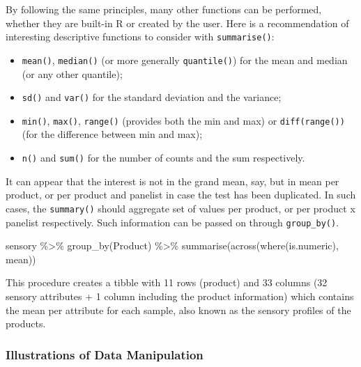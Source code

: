 \documentclass[
]{book}
\newenvironment{Shaded}{\begin{snugshade}}{\end{snugshade}}
\newcommand{\FunctionTok}[1]{\textcolor[rgb]{0.00,0.00,0.00}{#1}}
\newcommand{\NormalTok}[1]{#1}
\newcommand{\SpecialCharTok}[1]{\textcolor[rgb]{0.00,0.00,0.00}{#1}}
\providecommand{\tightlist}{%
  \setlength{\itemsep}{0pt}\setlength{\parskip}{0pt}}
\begin{document}
By following the same principles, many other functions can be performed, whether they are built-in R or created by the user.
Here is a recommendation of interesting descriptive functions to consider with \texttt{summarise()}:

\begin{itemize}
\tightlist
\item
  \texttt{mean()}, \texttt{median()} (or more generally \texttt{quantile()}) for the mean and median (or any other quantile);
\item
  \texttt{sd()} and \texttt{var()} for the standard deviation and the variance;
\item
  \texttt{min()}, \texttt{max()}, \texttt{range()} (provides both the min and max) or \texttt{diff(range())} (for the difference between min and max);
\item
  \texttt{n()} and \texttt{sum()} for the number of counts and the sum respectively.
\end{itemize}

It can appear that the interest is not in the grand mean, say, but in mean per product, or per product and panelist in case the test has been duplicated. In such cases, the \texttt{summary()} should aggregate set of values per product, or per product x panelist respectively. Such information can be passed on through \texttt{group\_by()}.

\begin{Shaded}
\begin{Highlighting}[]
\NormalTok{sensory }\SpecialCharTok{\%\textgreater{}\%} 
  \FunctionTok{group\_by}\NormalTok{(Product) }\SpecialCharTok{\%\textgreater{}\%} 
  \FunctionTok{summarise}\NormalTok{(}\FunctionTok{across}\NormalTok{(}\FunctionTok{where}\NormalTok{(is.numeric), mean))}
\end{Highlighting}
\end{Shaded}

This procedure creates a tibble with 11 rows (product) and 33 columns (32 sensory attributes + 1 column including the product information) which contains the mean per attribute for each sample, also known as the sensory profiles of the products.

\hypertarget{illustrations-of-data-manipulation}{%
\subsubsection{Illustrations of Data Manipulation}\label{illustrations-of-data-manipulation}}
\end{document}
